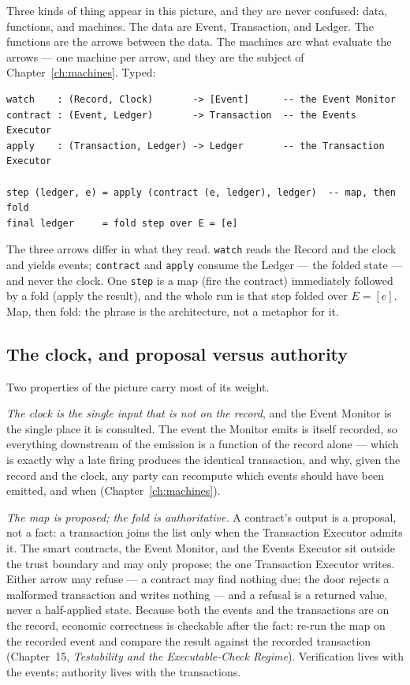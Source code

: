 Three kinds of thing appear in this picture, and they are never confused: data,
functions, and machines. The data are Event, Transaction, and Ledger. The functions are
the arrows between the data. The machines are what evaluate the arrows --- one machine per
arrow, and they are the subject of Chapter~\ref{ch:machines}. Typed:

\begin{lstlisting}
watch    : (Record, Clock)       -> [Event]      -- the Event Monitor
contract : (Event, Ledger)       -> Transaction  -- the Events Executor
apply    : (Transaction, Ledger) -> Ledger       -- the Transaction Executor

step (ledger, e) = apply (contract (e, ledger), ledger)  -- map, then fold
final ledger     = fold step over E = [e]
\end{lstlisting}

The three arrows differ in what they read. \texttt{watch} reads the Record and the clock
and yields events; \texttt{contract} and \texttt{apply} consume the Ledger --- the folded
state --- and never the clock. One \texttt{step} is a map (fire the contract) immediately
followed by a fold (apply the result), and the whole run is that step folded over
$E=[e]$. Map, then fold: the phrase is the architecture, not a metaphor for it.

\subsection{The clock, and proposal versus authority}

Two properties of the picture carry most of its weight.

\emph{The clock is the single input that is not on the record}, and the Event Monitor is
the single place it is consulted. The event the Monitor emits is itself recorded, so
everything downstream of the emission is a function of the record alone --- which is
exactly why a late firing produces the identical transaction, and why, given the record
and the clock, any party can recompute which events should have been emitted, and when
(Chapter~\ref{ch:machines}).

\emph{The map is proposed; the fold is authoritative.} A contract's output is a proposal,
not a fact: a transaction joins the list only when the Transaction Executor admits it. The
smart contracts, the Event Monitor, and the Events Executor sit outside the trust boundary
and may only propose; the one Transaction Executor writes. Either arrow may refuse --- a
contract may find nothing due; the door rejects a malformed transaction and writes nothing
--- and a refusal is a returned value, never a half-applied state. Because both the events
and the transactions are on the record, economic correctness is checkable after the fact:
re-run the map on the recorded event and compare the result against the recorded
transaction (Chapter~15, \emph{Testability and the Executable-Check Regime}). Verification
lives with the events; authority lives with the transactions.

